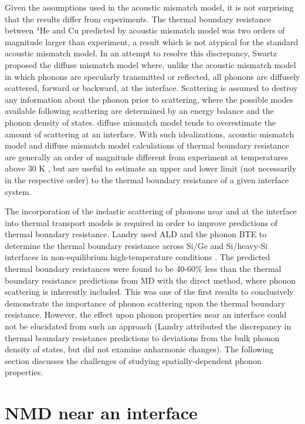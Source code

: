 Given the assumptions used in the acoustic mismatch model, it is not surprising that the results differ from experiments. The thermal boundary resistance between $^4$He and Cu predicted by acoustic mismatch model was two orders of magnitude larger than experiment, a result which is not atypical for the standard acoustic mismatch model. In an attempt to resolve this discrepancy, Swartz proposed the diffuse mismatch model \cite{swartz1987thermal} where, unlike the acoustic mismatch model in which phonons are specularly transmitted or reflected, all phonons are diffusely scattered, forward or backward, at the interface. Scattering is assumed to destroy any information about the phonon prior to scattering, where the possible modes available following scattering are determined by an energy balance and the phonon density of states. diffuse mismatch model tends to overestimate the amount of scattering at an interface. With such idealizations, acoustic mismatch model and diffuse mismatch model calculations of thermal boundary resistance are generally an order of magnitude different from experiment at temperatures above 30 K \cite{landrythesis}, but are useful to estimate an upper and lower limit (not necessarily in the respective order) to the thermal boundary resistance of a given interface system.

The incorporation of the inelastic scattering of phonons near and at the interface  into thermal transport models is required in order to improve predictions of thermal boundary resistance. Landry used ALD and the phonon BTE to determine the thermal boundary resistance across Si/Ge and Si/heavy-Si interfaces in non-equilibrium high-temperature conditions \cite{landrythesis}. The predicted thermal boundary resistances were found to be 40-60\% less than the thermal boundary resistance predictions from MD with the direct method, where phonon scattering is inherently included. This was one of the first results to conclusively demonstrate the importance of phonon scattering upon the thermal boundary resistance. However, the effect upon phonon properties near an interface could not be elucidated from such an approach (Landry attributed the discrepancy in thermal boundary resistance predictions to deviations from the bulk phonon density of states, but did not examine anharmonic changes). The following section discusses the challenges of studying spatially-dependent phonon properties.

\section{NMD near an interface}

